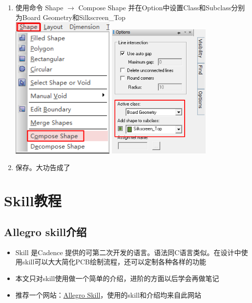 \documentclass[a4paper,twoside]{article}
\begin{document}
\begin{enumerate}
		\item 使用命令 Shape $\rightarrow$ Compose Shape 并在Option中设置Class和Subclass分别为Board Geometry和Silkscreen\_Top \\ \includegraphics[width=0.4\textwidth]{figures/ShapeComposeShape.png} \includegraphics[width=0.4\textwidth]{figures/OptionClassAndSubClass.png}
		\item 保存。大功告成了
	\end{enumerate}

\section{Skill教程}
	\subsection{Allegro skill介绍}
		\begin{itemize}
			\item Skill 是Cadence 提供的可第二次开发的语言。语法同C语言类似。在设计中使用skill可以大大简化PCB绘制流程，还可以定制各种各样的功能
			\item 本文只对skill使用做一个简单的介绍，进阶的方面以后学会再做笔记
			\item 推荐一个网站：\href{http://www.allegro-skill.com/?fromuid=7754}{Allegro Skill}，使用的skill和介绍均来自此网站
		\end{itemize}
\end{document}
